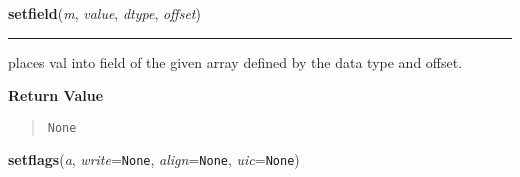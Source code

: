     \label{numpy:ndarray:setfield}

    \vspace{0.5ex}

    \begin{boxedminipage}{\textwidth}

    \raggedright \textbf{setfield}(\textit{m}, \textit{value}, \textit{dtype}, \textit{offset})

    \vspace{-1.5ex}

    \rule{\textwidth}{0.5\fboxrule}

places val into field of the given array defined by the data type and offset.
    \vspace{1ex}

      \textbf{Return Value}
      \begin{quote}
\begin{alltt}
None
\end{alltt}

      \end{quote}

    \vspace{1ex}

    \end{boxedminipage}

    \label{numpy:ndarray:setflags}

    \vspace{0.5ex}

    \begin{boxedminipage}{\textwidth}

    \raggedright \textbf{setflags}(\textit{a}, \textit{write}=\texttt{None}, \textit{align}=\texttt{None}, \textit{uic}=\texttt{None})

    \end{boxedminipage}

    \label{numpy:ndarray:sort}

    \vspace{0.5ex}

